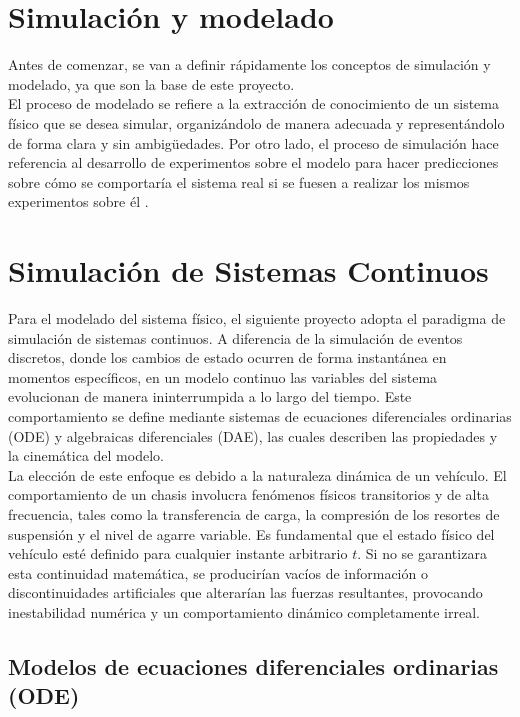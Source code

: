 \section{Simulación y modelado}
Antes de comenzar, se van a definir rápidamente los conceptos de simulación y modelado, ya que son la base de este proyecto. \\
El proceso de modelado se refiere a la extracción de conocimiento 
de un sistema físico que se desea simular, organizándolo de manera adecuada y representándolo de forma clara y sin ambigüedades. 
Por otro lado, el proceso de simulación hace referencia al desarrollo de experimentos sobre el modelo para hacer predicciones
sobre cómo se comportaría el sistema real si se fuesen a realizar los mismos experimentos sobre él  \cite{cellier2006}. \\


\section{Simulación de Sistemas Continuos}
Para el modelado del sistema físico, el siguiente proyecto adopta el paradigma de simulación de sistemas continuos. A diferencia de la simulación de eventos discretos, donde los cambios de estado ocurren de forma instantánea en momentos específicos, en un modelo continuo las variables del sistema evolucionan de manera ininterrumpida a lo largo del tiempo. Este comportamiento se define mediante sistemas de ecuaciones diferenciales ordinarias (ODE) y algebraicas diferenciales (DAE), las cuales describen las propiedades y la cinemática del modelo.\\


La elección de este enfoque es debido a la naturaleza dinámica de un vehículo. El comportamiento de un chasis involucra fenómenos físicos transitorios y de alta frecuencia, tales como la transferencia de carga, la compresión de los resortes de suspensión y el nivel de agarre variable. Es fundamental que el estado físico del vehículo esté definido para cualquier instante arbitrario $t$. Si no se garantizara esta continuidad matemática, se producirían vacíos de información o discontinuidades artificiales que alterarían las fuerzas resultantes, provocando inestabilidad numérica y un comportamiento dinámico completamente irreal. \\

\subsection{Modelos de ecuaciones diferenciales ordinarias (ODE)}

